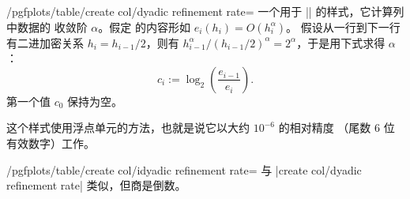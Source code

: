 \documentclass[a4paper,doc2]{ltxdoc}
\begin{document}
\begin{stylekey}{/pgfplots/table/create col/dyadic refinement rate=}
    一个用于 |\pgfplotstablecreatecol| 的样式，它计算列  中数据的
    收敛阶 $\alpha$。假定  的内容形如 $e_i(h_i) = O(h_i^\alpha)$。
    假设从一行到下一行有二进加密关系 $h_i = h_{i-1}/2$，则有
    $h_{i-1}^\alpha / (h_{i-1}/2)^\alpha = 2^\alpha$，于是用下式求得 $\alpha$：
        \[
            c_i := \log_2\left( \frac{e_{i-1}}{e_i} \right).
        \]
    第一个值 $c_0$ 保持为空。
\begin{codeexample}[]
\end{codeexample}
    这个样式使用浮点单元的方法，也就是说它以大约 $10^{-6}$ 的相对精度
    （尾数 $6$ 位有效数字）工作。
\end{stylekey}

\begin{stylekey}{/pgfplots/table/create col/idyadic refinement rate=}
    与 |create col/dyadic refinement rate| 类似，但商是倒数。
\end{stylekey}
\end{document}
